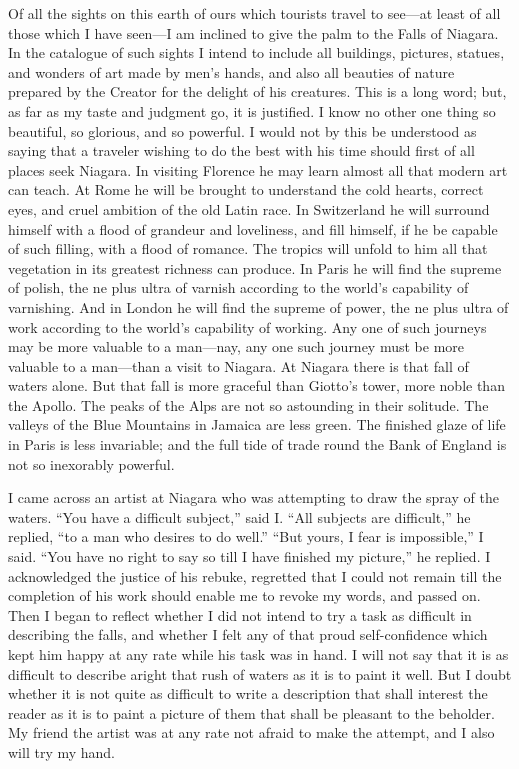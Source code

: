 Of all the sights on this earth of ours which tourists travel to
see---at least of all those which I have seen---I am inclined to give
the palm to the Falls of Niagara.  In the catalogue of such sights
I intend to include all buildings, pictures, statues, and wonders
of art made by men's hands, and also all beauties of nature
prepared by the Creator for the delight of his creatures.  This is
a long word; but, as far as my taste and judgment go, it is
justified.  I know no other one thing so beautiful, so glorious,
and so powerful.  I would not by this be understood as saying that
a traveler wishing to do the best with his time should first of all
places seek Niagara.  In visiting Florence he may learn almost all
that modern art can teach.  At Rome he will be brought to
understand the cold hearts, correct eyes, and cruel ambition of the
old Latin race.  In Switzerland he will surround himself with a
flood of grandeur and loveliness, and fill himself, if he be
capable of such filling, with a flood of romance.  The tropics will
unfold to him all that vegetation in its greatest richness can
produce.  In Paris he will find the supreme of polish, the ne plus
ultra of varnish according to the world's capability of varnishing.
And in London he will find the supreme of power, the ne plus ultra
of work according to the world's capability of working.  Any one of
such journeys may be more valuable to a man---nay, any one such
journey must be more valuable to a man---than a visit to Niagara.
At Niagara there is that fall of waters alone.  But that fall is
more graceful than Giotto's tower, more noble than the Apollo.  The
peaks of the Alps are not so astounding in their solitude.  The
valleys of the Blue Mountains in Jamaica are less green.  The
finished glaze of life in Paris is less invariable; and the full
tide of trade round the Bank of England is not so inexorably
powerful.

I came across an artist at Niagara who was attempting to draw the
spray of the waters.  ``You have a difficult subject,'' said I.  ``All
subjects are difficult,'' he replied, ``to a man who desires to do
well.''  ``But yours, I fear is impossible,'' I said.  ``You have no
right to say so till I have finished my picture,'' he replied.  I
acknowledged the justice of his rebuke, regretted that I could not
remain till the completion of his work should enable me to revoke
my words, and passed on.  Then I began to reflect whether I did not
intend to try a task as difficult in describing the falls, and
whether I felt any of that proud self-confidence which kept him
happy at any rate while his task was in hand.  I will not say that
it is as difficult to describe aright that rush of waters as it is
to paint it well.  But I doubt whether it is not quite as difficult
to write a description that shall interest the reader as it is to
paint a picture of them that shall be pleasant to the beholder.  My
friend the artist was at any rate not afraid to make the attempt,
and I also will try my hand.

